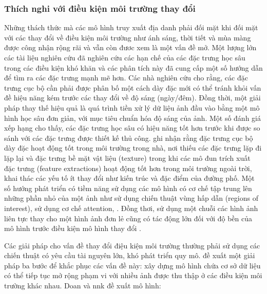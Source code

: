 \subsubsection{Thích nghi với điều kiện môi trường thay đổi}

Những thách thức mà các mô hình truy xuất địa danh phải đối mặt khi đối mặt với các thay đổi về điều kiện môi trường như ánh sáng, thời tiết và mùa màng được công nhận rộng rãi\cite{zaffar2019levelling} và vẫn còn đươc xem là một vấn đề mở. Một lượng lớn các tài liệu nghiên cứu đã nghiên cứu các hạn chế của các đặc trưng học sâu trong các điều kiện khó khăn \cite{zhou2016evaluating, sunderhauf2015performance, chen2017deep} và các phân tích này đã cung cấp một số hướng dẫn để tìm ra các đặc trưng mạnh mẽ hơn. Các nhà nghiên cứu cho rằng, các đặc trưng cục bộ cần phải được phân bố một cách dày đặc mới có thể tránh khỏi vấn đề hiệu năng kém trước các thay đổi về độ sáng (ngày/đêm). Đồng thời, một giải pháp thay thế hiệu quả là quá trình tiền xử lý dữ liệu ảnh đầu vào bằng một mô hình học sâu đơn giản, với mục tiêu chuẩn hóa độ sáng của ảnh. Một số đánh giá xếp hạng cho thấy, các đặc trưng học sâu có hiệu năng tốt hơn trước khi được so sánh với các đặc trưng được thiết kế thủ công\cite{arandjelovic2017netvlad}. \cite{taira2018inloc} ghi nhận rằng đặc trưng cục bộ dày đặc hoạt động tốt trong môi trường trong nhà, nơi thiếu các đặc trưng lặp đi lặp lại và đặc trưng bề mặt vật liệu (texture) trong khi các mô đun trích xuất đặc trưng (feature extractions) hoạt động tốt hơn trong môi trường ngoài trời, khai thác các yếu tố ít thay đổi như kiến trúc và đặc điểm của đường phố. Một số hướng phát triển có tiềm năng sử dụng các mô hình có cơ chế tập trung lên những phần nhỏ của một ảnh như \cite{sunderhauf2015place, chen2017only, khaliq2019holistic} sử dụng chiến thuật vùng hấp dẫn (regions of interest), \cite{zhu2018attention, chen2017only, khaliq2019holistic, wang2019atloc, wang2022transvpr, alibey2023mixvpr} sử dụng cơ chế attention, \cite{garg2018lost, naseer2017semantics, seymour2019semantically}. Đồng thơi, sử dụng một chuỗi các hình ảnh liên tực thay cho một hình ảnh đơn lẻ cũng có tác động lớn đối với độ bền của mô hình trước điều kiện mô hình thay đổi \cite{naseer2018robust, hausler2019multi, hong2019textplace, chancan2020hybrid}.

Các giải pháp cho vấn đề thay đổi điệu kiện môi trường thường phải sử dụng các chiến thuật có yêu cầu tài nguyên lớn, khó phát triển quy mô. \cite{doan2019scalable} đề xuất một giải pháp ba bước để khắc phục các vấn đề này: xây dựng mô hình chứa cơ sở dữ liệu có thể tiếp tục mở rộng phạm vi với nhiều ảnh được thu thập ở các điều kiện môi trường khác nhau. Doan và nnk đề xuất mô hình:

